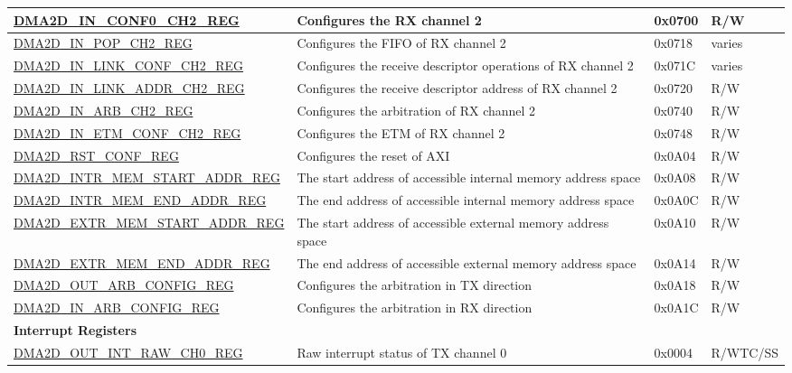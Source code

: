 \begin{longtable}{ | p{7cm} | p{11.5cm} | p{1.3cm} | p{2cm} | }
\hyperref[regdesc:DMA2DINCONF0CHNREG]{DMA2D\_IN\_CONF0\_CH2\_REG} & Configures the RX channel 2 & 0x0700 & R/W \\ \hline
\hyperref[regdesc:DMA2DINPOPCHNREG]{DMA2D\_IN\_POP\_CH2\_REG} & Configures the FIFO of RX channel 2 & 0x0718 & varies \\ \hline
\hyperref[regdesc:DMA2DINLINKCONFCHNREG]{DMA2D\_IN\_LINK\_CONF\_CH2\_REG} & Configures the receive descriptor operations of RX channel 2 & 0x071C & varies \\ \hline
\hyperref[regdesc:DMA2DINLINKADDRCHNREG]{DMA2D\_IN\_LINK\_ADDR\_CH2\_REG} & Configures the receive descriptor address of RX channel 2 & 0x0720 & R/W \\ \hline
\hyperref[regdesc:DMA2DINARBCHNREG]{DMA2D\_IN\_ARB\_CH2\_REG} & Configures the arbitration of RX channel 2 & 0x0740 & R/W \\ \hline
\hyperref[regdesc:DMA2DINETMCONFCHNREG]{DMA2D\_IN\_ETM\_CONF\_CH2\_REG} & Configures the ETM of RX channel 2 & 0x0748 & R/W \\ \hline
\hyperref[regdesc:DMA2DRSTCONFREG]{DMA2D\_RST\_CONF\_REG} & Configures the reset of AXI & 0x0A04 & R/W \\ \hline
\hyperref[regdesc:DMA2DINTRMEMSTARTADDRREG]{DMA2D\_INTR\_MEM\_START\_ADDR\_REG} & The start address of accessible internal memory address space & 0x0A08 & R/W \\ \hline
\hyperref[regdesc:DMA2DINTRMEMENDADDRREG]{DMA2D\_INTR\_MEM\_END\_ADDR\_REG} & The end address of accessible internal memory address space & 0x0A0C & R/W \\ \hline
\hyperref[regdesc:DMA2DEXTRMEMSTARTADDRREG]{DMA2D\_EXTR\_MEM\_START\_ADDR\_REG} & The start address of accessible external memory address space & 0x0A10 & R/W \\ \hline
\hyperref[regdesc:DMA2DEXTRMEMENDADDRREG]{DMA2D\_EXTR\_MEM\_END\_ADDR\_REG} & The end address of accessible external memory address space & 0x0A14 & R/W \\ \hline
\hyperref[regdesc:DMA2DOUTARBCONFIGREG]{DMA2D\_OUT\_ARB\_CONFIG\_REG} & Configures the arbitration in TX direction & 0x0A18 & R/W \\ \hline
\hyperref[regdesc:DMA2DINARBCONFIGREG]{DMA2D\_IN\_ARB\_CONFIG\_REG} & Configures the arbitration in RX direction & 0x0A1C & R/W \\ \hline
\multicolumn{4}{|l|}{\textbf{Interrupt Registers}} \\ \hline
\hyperref[regdesc:DMA2DOUTINTRAWCHNREG]{DMA2D\_OUT\_INT\_RAW\_CH0\_REG} & Raw interrupt status of TX channel 0 & 0x0004 & R/WTC/SS \\ \hline

\end{longtable}
